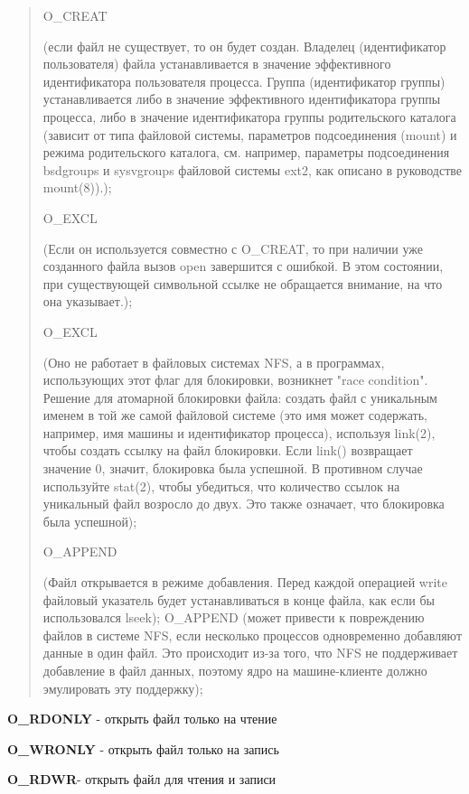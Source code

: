 \begin{quote}

O\_CREAT

(если файл не существует, то он будет создан. Владелец (идентификатор пользователя) файла устанавливается в значение эффективного идентификатора пользователя процесса. Группа (идентификатор группы) устанавливается либо в значение эффективного идентификатора группы процесса, либо в значение идентификатора группы родительского каталога (зависит от типа файловой системы, параметров подсоединения (mount) и режима родительского каталога, см. например, параметры подсоединения bsdgroups и sysvgroups файловой системы ext2, как описано в руководстве mount(8)).);

O\_EXCL

(Если он используется совместно с O\_CREAT, то при наличии уже созданного файла вызов open завершится с ошибкой. В этом состоянии, при существующей символьной ссылке не обращается внимание, на что она указывает.);

O\_EXCL

(Оно не работает в файловых системах NFS, а в программах, использующих этот флаг для блокировки, возникнет "race condition". Решение для атомарной блокировки файла: создать файл с уникальным именем в той же самой файловой системе (это имя может содержать, например, имя машины и идентификатор процесса), используя link(2), чтобы создать ссылку на файл блокировки. Если link() возвращает значение 0, значит, блокировка была успешной. В противном случае используйте stat(2), чтобы убедиться, что количество ссылок на уникальный файл возросло до двух. Это также означает, что блокировка была успешной);

O\_APPEND

(Файл открывается в режиме добавления. Перед каждой операцией write файловый указатель будет устанавливаться в конце файла, как если бы использовался lseek); O\_APPEND (может привести к повреждению файлов в системе NFS, если несколько процессов одновременно добавляют данные в один файл. Это происходит из-за того, что NFS не поддерживает добавление в файл данных, поэтому ядро на машине-клиенте должно эмулировать эту поддержку);

\end{quote}

\textbf{O\_RDONLY} - открыть файл только на чтение

\textbf{O\_WRONLY} - открыть файл только на запись

\textbf{O\_RDWR}- открыть файл для чтения и записи


